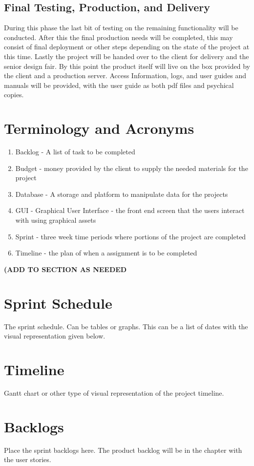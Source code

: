 \subsection{Final Testing, Production, and Delivery}
During this phase the last bit of testing on the remaining functionality will be conducted. After this the final production needs will be completed, this may consist of final deployment or other steps depending on the state of the project at this time. Lastly the project will be handed over to the client for delivery and the senior design fair. By this point the product itself will live on the box provided by the client and a production server. Access Information, logs, and user guides and manuals will be provided, with the user guide as both pdf files and psychical copies.


\section{Terminology and Acronyms}
\begin{enumerate}
\item Backlog - A list of task to be completed
\item Budget - money provided by the client to supply the needed materials for the project
\item Database - A storage and platform to manipulate data for the projects 
\item GUI - Graphical User Interface - the front end screen that the users interact with using graphical assets
\item Sprint - three week time periods where portions of the project are completed
\item Timeline - the plan of when a assignment is to be completed
\end{enumerate}
\bf(ADD TO SECTION AS NEEDED 

\section{Sprint Schedule}
The sprint schedule.  Can be tables or graphs.   This can be a list of dates with the visual 
representation given below.

\section{Timeline}
Gantt chart or other type of visual representation of the project timeline.

\section{Backlogs}
Place the sprint backlogs here.    The product backlog will be in the chapter with the user 
stories.   


